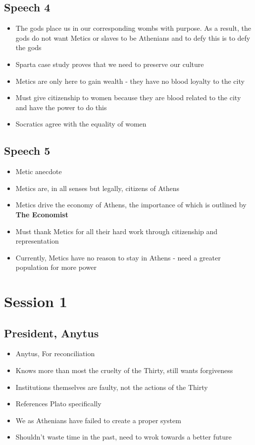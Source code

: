 \documentclass[11pt]{article}
\begin{document}
\subsection{Speech 4}
\label{sec:org299ca01}
\begin{itemize}
\item The gods place us in our corresponding wombs with purpose. As a result, the gods do not want
Metics or slaves to be Athenians and to defy this is to defy the gods
\item Sparta case study proves that we need to preserve our culture
\item Metics are only here to gain wealth - they have no blood loyalty to the city
\item Must give citizenship to women because they are blood related to the city and have the power
to do this
\item Socratics agree with the equality of women
\end{itemize}
\subsection{Speech 5}
\label{sec:org3c189ca}
\begin{itemize}
\item Metic anecdote
\item Metics are, in all senses but legally, citizens of Athens
\item Metics drive the economy of Athens, the importance of which is outlined by \textbf{\textbf{The Economist}}
\item Must thank Metics for all their hard work through citizenship and representation
\item Currently, Metics have no reason to stay in Athens - need a greater population for more power
\end{itemize}
\section{Session 1}
\label{sec:org3de1746}
\subsection{President, Anytus}
\label{sec:orge4a825c}
\begin{itemize}
\item Anytus, For reconciliation
\item Knows more than most the cruelty of the Thirty, still wants forgiveness
\item Institutions themselves are faulty, not the actions of the Thirty
\item References Plato specifically
\item We as Athenians have failed to create a proper system
\item Shouldn't waste time in the past, need to wrok towards a better future
\end{itemize}
\end{document}

